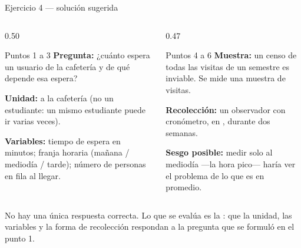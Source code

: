 \documentclass[aspectratio=169,10pt]{beamer}
\begin{document}
\begin{frame}{Ejercicio 4 — solución sugerida}
  \scriptsize
  \begin{columns}[T,onlytextwidth]
    \begin{column}{0.50\textwidth}
      \begin{block}{Puntos 1 a 3}
        \tiny
        \textbf{Pregunta:} ¿cuánto espera un usuario de la cafetería y de qué
        depende esa espera?

        \vspace{0.08cm}
        \textbf{Unidad:}  a la cafetería (no un estudiante:
        un mismo estudiante puede ir varias veces).

        \vspace{0.08cm}
        \textbf{Variables:} tiempo de espera en minutos; franja horaria
        (mañana / mediodía / tarde); número de personas en fila al llegar.
      \end{block}
    \end{column}
    \begin{column}{0.47\textwidth}
      \begin{exampleblock}{Puntos 4 a 6}
        \tiny
        \textbf{Muestra:} un censo de todas las visitas de un semestre es
        inviable. Se mide una muestra de visitas.

        \vspace{0.08cm}
        \textbf{Recolección:} un observador con cronómetro, en , durante dos semanas.

        \vspace{0.08cm}
        \textbf{Sesgo posible:} medir solo al mediodía —la hora pico— haría ver
        el problema  de lo que es en promedio.
      \end{exampleblock}
    \end{column}
  \end{columns}

  \vspace{0.05cm}
  {\tiny\color{uniGris} No hay una única respuesta correcta. Lo que se evalúa
  es la : que la unidad, las variables y la forma de
  recolección respondan a la pregunta que se formuló en el punto 1.}
\end{frame}
\end{document}
